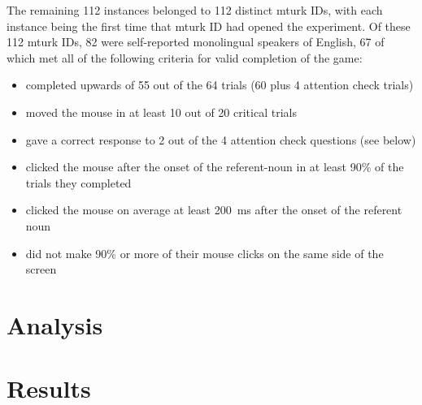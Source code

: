 \documentclass[a4paper,man,natbib]{apa6}
\begin{document}
The remaining 112 instances belonged to 112 distinct mturk IDs, with each instance being the first time that mturk ID had opened the experiment. 
Of these 112 mturk IDs, 82 were self-reported monolingual speakers of English, 67 of which met all of the following criteria for valid completion of the game: 
\begin{itemize}
\item completed upwards of 55 out of the 64 trials (60 plus 4 attention check trials)
\item moved the mouse in at least 10 out of 20 critical trials
\item gave a correct response to 2 out of the 4 attention check questions (see below)
\item clicked the mouse after the onset of the referent-noun in at least 90\% of the trials they completed
\item clicked the mouse on average at least 200~ms after the onset of the referent noun
\item did not make 90\% or more of their mouse clicks on the same side of the screen
\end{itemize}

\section*{Analysis}

\section*{Results}
\end{document}
